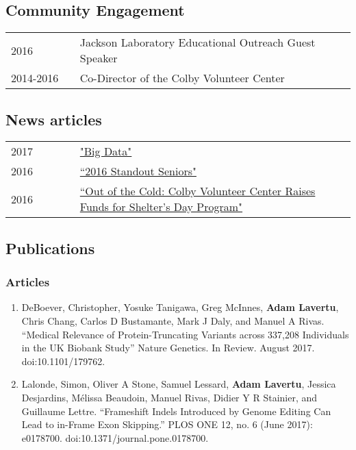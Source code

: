 \documentclass[12pt,]{scrartcl}
\begin{document}
\subsection{Community Engagement}\label{community-engagement}
\begin{table}[!h]
{\def\arraystretch{1.5}\tabcolsep=4pt
\begin{tabular}{p{0.2\linewidth}p{0.8\linewidth}}
	2016 & Jackson Laboratory Educational Outreach Guest Speaker\\
  2014-2016 & Co-Director of the Colby Volunteer Center\\
\end{tabular}%
}
\end{table}

\subsection{News articles}\label{news}
\begin{table}[!h]
{\def\arraystretch{1.5}\tabcolsep=4pt
\begin{tabular}{p{0.2\linewidth}p{0.8\linewidth}}
	2017 & \href{https://www.colby.edu/magazine/big-data/}{"Big Data"}\\
	2016 & \href{http://www.colby.edu/commencement/profiles/lavertu-adam/}{``2016 Standout Seniors"}\\
  	2016 & \href{https://www.colby.edu/goldfarb/2015/12/16/out-of-the-cold-colby-volunteer-center-raises-funds-for-shelters-day-program/}{``Out of the Cold: Colby Volunteer Center Raises Funds for Shelter’s Day Program"}
    \end{tabular}%
}
\end{table}

\subsection{Publications}\label{publications}

\subsubsection{Articles}\label{articles}

\begin{enumerate}
  \leftskip-0.13in %
  \item DeBoever, Christopher, Yosuke Tanigawa, Greg McInnes, \textbf{Adam Lavertu}, Chris Chang, Carlos D Bustamante, Mark J Daly, and Manuel A Rivas. “Medical Relevance of Protein-Truncating Variants across 337,208 Individuals in the {UK} Biobank Study” Nature Genetics. In Review. August 2017. doi:10.1101/179762.
  \item Lalonde, Simon, Oliver A Stone, Samuel Lessard, \textbf{Adam Lavertu}, Jessica Desjardins, Mélissa Beaudoin, Manuel Rivas, Didier Y R Stainier, and Guillaume Lettre. “Frameshift Indels Introduced by Genome Editing Can Lead to in-Frame Exon Skipping.” {PLOS} {ONE} 12, no. 6 (June 2017): e0178700. doi:10.1371/journal.pone.0178700.
\end{enumerate}
\end{document}
